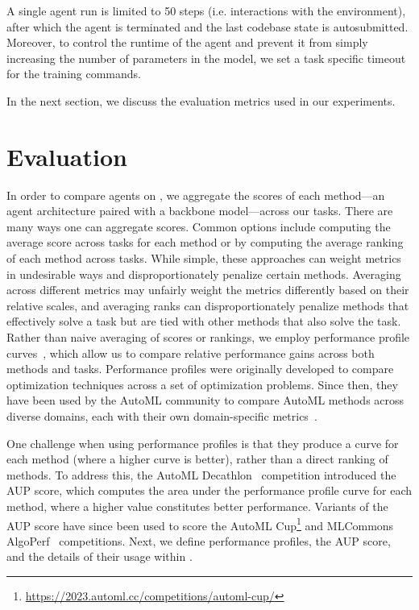 A single agent run is limited to 50 steps (i.e. interactions with the environment), after which the agent is terminated and the last codebase state is autosubmitted.
%
Moreover, to control the runtime of the agent and prevent it from simply increasing the number of parameters in the model, we set a task specific timeout for the training commands.

In the next section, we discuss the evaluation metrics used in our experiments.

\section{Evaluation}
\label{sec:evaluation}



In order to compare agents on \mlgym, we aggregate the scores of each method---an agent architecture paired with a backbone model---across our tasks. 
%
There are many ways one can aggregate scores. 
%
Common options include computing the average score across tasks for each method or by computing the average ranking of each method across tasks. 
%
While simple, these approaches can weight metrics in undesirable ways and disproportionately penalize certain methods. 
%
Averaging across different metrics may unfairly weight the metrics differently based on their relative scales, and averaging ranks can disproportionately penalize methods that effectively solve a task but are tied with other methods that also solve the task. 
%
Rather than naive averaging of scores or rankings, we employ performance profile curves~\citep{dolanBenchmarkingOptimizationSoftware2002}, which allow us to compare relative performance gains across both methods and tasks. 
%
Performance profiles were originally developed to compare optimization techniques across a set of optimization problems. 
%
Since then, they have been used by the AutoML community to compare AutoML methods across diverse domains, each with their own domain-specific metrics~\citep{nasbench360,autowsbench101}. 

One challenge when using performance profiles is that they produce a curve for each method (where a higher curve is better), rather than a direct ranking of methods. 
%
To address this, the AutoML Decathlon~\citep{automldecathlon} competition introduced the AUP score, which computes the area under the performance profile curve for each method, where a higher value constitutes better performance. 
%
Variants of the AUP score have since been used to score the AutoML Cup\footnote{\url{https://2023.automl.cc/competitions/automl-cup/}} and MLCommons AlgoPerf~\citep{algoperf} competitions. 
%
Next, we define performance profiles, the AUP score, and the details of their usage within \mlgym. 

